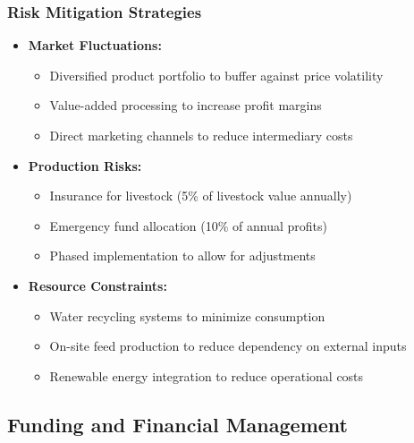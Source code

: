 \subsubsection{Risk Mitigation Strategies}
\begin{itemize}
    \item \textbf{Market Fluctuations:}
    \begin{itemize}
        \item Diversified product portfolio to buffer against price volatility
        \item Value-added processing to increase profit margins
        \item Direct marketing channels to reduce intermediary costs
    \end{itemize}
    
    \item \textbf{Production Risks:}
    \begin{itemize}
        \item Insurance for livestock (5\% of livestock value annually)
        \item Emergency fund allocation (10\% of annual profits)
        \item Phased implementation to allow for adjustments
    \end{itemize}
    
    \item \textbf{Resource Constraints:}
    \begin{itemize}
        \item Water recycling systems to minimize consumption
        \item On-site feed production to reduce dependency on external inputs
        \item Renewable energy integration to reduce operational costs
    \end{itemize}
\end{itemize}

\subsection{Funding and Financial Management}


